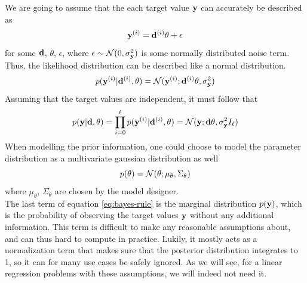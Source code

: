 We are going to assume that the each target value $\mathbf{y}$ can accurately be described as
\begin{equation}
  \label{eq:likelihood-generating}
  \mathbf{y}^{(i)} = \mathbf{d}^{(i)}\theta + \epsilon
\end{equation}
for some $\mathbf{d}$, $\theta$, $\epsilon$, where $\epsilon \sim \mathcal{N}(0, \sigma^2_{\mathbf{y}})$ is some normally distributed noise term.
Thus, the likelihood distribution can be described like a normal distribution.
\begin{equation}
  \label{eq:likelihood-single}
  p(\textbf{y}^{(i)} | \mathbf{d}^{(i)}, \mathbf{\theta}) = \mathcal{N}(\mathbf{y}^{(i)}; \mathbf{d}^{(i)}\mathbf{\theta}, \sigma^2_{\mathbf{y}})
\end{equation}
Assuming that the target values are independent, it must follow that
\begin{equation}
  \label{eq:likelihood}
  p(\textbf{y} | \mathbf{d}, \mathbf{\theta}) = \prod_{i=0}^\ell p(\textbf{y}^{(i)} | \mathbf{d}^{(i)}, \mathbf{\theta}) = \mathcal{N}(\mathbf{y}; \mathbf{d}\mathbf{\theta}, \sigma^2_{\mathbf{y}}I_\ell)
\end{equation}
When modelling the prior information, one could choose to model the parameter distribution as a multivariate gaussian distribution as well
\begin{equation}
  \label{eq:prior}
  p(\mathbf{\theta}) = \mathcal{N}(\theta; \mu_{\theta}, \Sigma_\theta)
\end{equation}
where $\mu_\theta$, $\Sigma_\theta$ are chosen by the model designer.\\
The last term of equation \ref{eq:bayes-rule} is the marginal distribution $p(\mathbf{y})$, which is the probability of observing the target values $\mathbf{y}$ without any additional information. 
This term is difficult to make any reasonable assumptions about, and can thus hard to compute in practice.
Lukily, it mostly acts as a normalization term that makes sure that the posterior distribution integrates to 1, so it can for many use cases be safely ignored.
As we will see, for a linear regression problems with these assumptions, we will indeed not need it.

